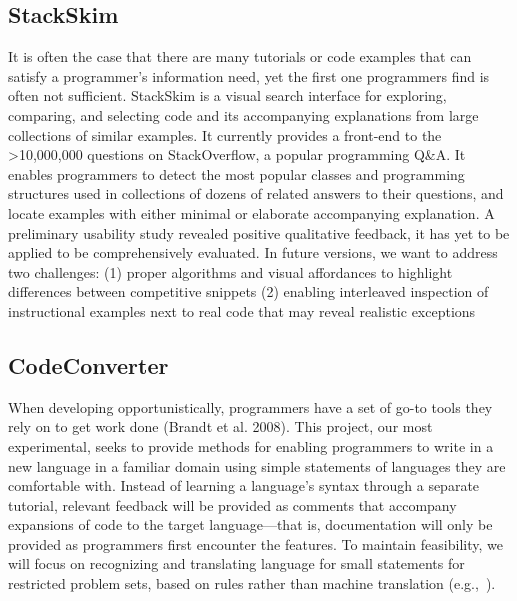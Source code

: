 \documentclass[12pt]{memoir}
\begin{document}
\subsection{StackSkim}
It is often the case that there are many tutorials or code examples that can satisfy a programmer's information need, yet the first one programmers find is often not sufficient.
StackSkim is a visual search interface for exploring, comparing, and selecting code and its accompanying explanations from large collections of similar examples.
It currently provides a front-end to the >10,000,000 questions on StackOverflow, a popular programming Q\&A.
It enables programmers to detect the most popular classes and programming structures used in collections of dozens of related answers to their questions, and locate examples with either minimal or elaborate accompanying explanation.
A preliminary usability study revealed positive qualitative feedback, it has yet to be applied to be comprehensively evaluated.
In future versions, we want to address two challenges: 
(1) proper algorithms and visual affordances to highlight differences between competitive snippets
(2) enabling interleaved inspection of instructional examples next to real code that may reveal realistic exceptions

\subsection{CodeConverter}
When developing opportunistically, programmers have a set of go-to tools they rely on to get work done (Brandt et al. 2008).
This project, our most experimental, seeks to provide methods for enabling programmers to write in a new language in a familiar domain using simple statements of languages they are comfortable with.
Instead of learning a language's syntax through a separate tutorial, relevant feedback will be provided as comments that accompany expansions of code to the target language---that is, documentation will only be provided as programmers first encounter the features.
To maintain feasibility, we will focus on recognizing and translating language for small statements for restricted problem sets, based on rules rather than machine translation (e.g.,~\cite{karaivanov_phrase-based_2014}).
\end{document}
